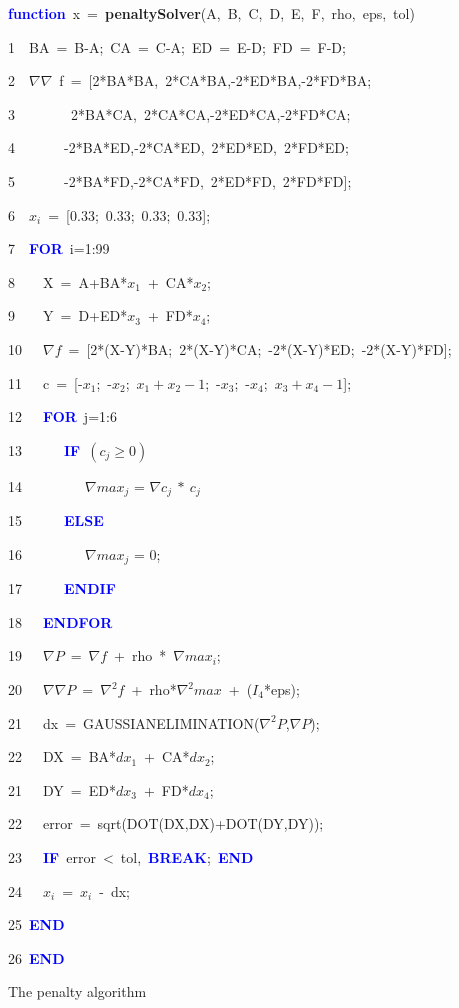 \documentclass[times,12pt]{ACME2015article}
\newenvironment{lyxcode}
{\par\begin{list}{}{
\setlength{\rightmargin}{\leftmargin}
\setlength{\listparindent}{0pt}%
\raggedright
\setlength{\itemsep}{0pt}
\setlength{\parsep}{0pt}
\normalfont\ttfamily}%
 \item[]}
{\end{list}}
\begin{document}
\begin{algorithm}
\begin{lyxcode}
\textbf{\textcolor{blue}{function}}~x~=~\textbf{penaltySolver}(A,~B,~C,~D,~E,~F,~rho,~eps,~tol)

1~~BA~=~B-A;~CA~=~C-A;~ED~=~E-D;~FD~=~F-D;

2~~$\nabla \nabla$~f~=~{[}2{*}BA{*}BA,~2{*}CA{*}BA,-2{*}ED{*}BA,-2{*}FD{*}BA;

3~~~~~~~~2{*}BA{*}CA,~2{*}CA{*}CA,-2{*}ED{*}CA,-2{*}FD{*}CA;

4~~~~~~~-2{*}BA{*}ED,-2{*}CA{*}ED,~2{*}ED{*}ED,~2{*}FD{*}ED;

5~~~~~~~-2{*}BA{*}FD,-2{*}CA{*}FD,~2{*}ED{*}FD,~2{*}FD{*}FD{]};

6~~$x_{i}$~=~{[}0.33;~0.33;~0.33;~0.33{]};

7~~\textbf{\textcolor{blue}{FOR}}~i=1:99

8~~~~X~=~A+BA{*}$x_{1}$~+~CA{*}$x_{2}$;

9~~~~Y~=~D+ED{*}$x_{3}$~+~FD{*}$x_{4}$;

10~~~$\nabla f$~=~{[}2{*}(X-Y){*}BA;~2{*}(X-Y){*}CA;~-2{*}(X-Y){*}ED;~-2{*}(X-Y){*}FD{]};~

11~~~c~=~[-$x_{1}$;~-$x_{2}$;~$x_{1}+x_{2}-1$;~-$x_{3}$;~-$x_{4}$;~$x_{3}+x_{4}-1$];

12~~~\textbf{\textcolor{blue}{FOR}}~j=1:6

13~~~~~~\textbf{\textcolor{blue}{IF}}~$(c_{j} \geq 0)$

14~~~~~~~~~$\nabla max_{j}$ = $\nabla c_{j}~{*}~c_{j}$
	
15~~~~~~\textbf{\textcolor{blue}{ELSE}}
	
16~~~~~~~~~$\nabla max_{j}$ = 0;
	
17~~~~~~\textbf{\textcolor{blue}{ENDIF}}

18~~~\textbf{\textcolor{blue}{ENDFOR}}

19~~~$\nabla P$~=~$\nabla f$~+~rho~{*}~$\nabla max_{i}$;

20~~~$\nabla \nabla P$~=~$\nabla ^2 f$~+~rho{*}$\nabla^2 max$~+~($I_{4}$*eps);

21~~~dx~=~GAUSSIAN\textunderscore ELIMINATION($\nabla ^2 P$,$\nabla P$);

22~~~DX~=~BA{*}$dx_{1}$~+~CA{*}$dx_{2}$;

21~~~DY~=~ED{*}$dx_{3}$~+~FD{*}$dx_{4}$;

22~~~error~=~sqrt(DOT(DX,DX)+DOT(DY,DY));

23~~~\textbf{\textcolor{blue}{IF}}~error~<~tol,~\textbf{\textcolor{blue}{BREAK}};~\textbf{\textcolor{blue}{END}}

24~~~$x_{i}$~=~$x_{i}$~-~dx;

25~\textbf{\textcolor{blue}{END}}

26~\textbf{\textcolor{blue}{END}}

\end{lyxcode}
\protect\caption{\label{alg5}The penalty algorithm}
\end{algorithm}
\end{document}
